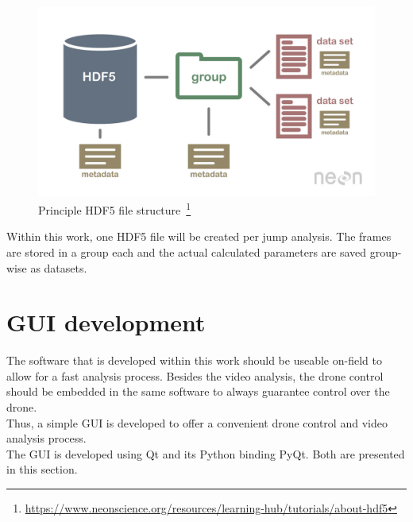 \begin{figure}[!h]
    \centering
    \includegraphics[scale=0.24]{figures/hdf5_general_structure.jpg}
    \caption[HDF5 file structure]
    {Principle HDF5 file structure~\footnote{
        \url{https://www.neonscience.org/resources/learning-hub/tutorials/about-hdf5}}}
    \label{fig:2_principle_hdf5_structure}
\end{figure}
\FloatBarrier
\noindent Within this work, one HDF5 file will be created per jump analysis.
The frames are stored in a group each and the actual calculated parameters are 
saved group-wise as datasets.

\section{\acs*{GUI} development}
The software that is developed within this work should be useable on-field to
allow for a fast analysis process.
Besides the video analysis, the drone control should be embedded in the same 
software to always guarantee control over the drone.\\
Thus, a simple \ac{GUI} is developed to offer a convenient drone control and 
video analysis process.\\
The \ac{GUI} is developed using Qt and its Python binding PyQt.
Both are presented in this section. 

